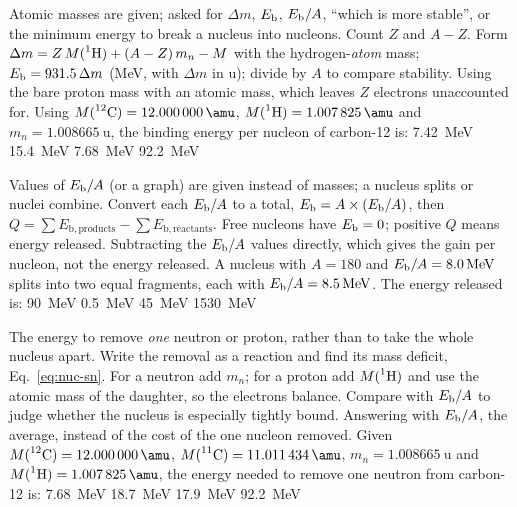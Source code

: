 {Atomic masses are given; asked for $\Delta m$, $E_{\mathrm{b}}$, $E_{\mathrm{b}}/A$, ``which is more stable'', or the
minimum energy to break a nucleus into nucleons.}
{Count $Z$ and $A-Z$. Form $\Delta m=Z\,M(\prescript{1}{}{\mathrm{H}})+(A-Z)\,m_n-M$ with the hydrogen-\emph{atom} mass;
$E_{\mathrm{b}}=931.5\,\Delta m$ (\si{\MeV}, with $\Delta m$ in \si{\amu}); divide by $A$ to compare stability.}
{Using the bare proton mass with an atomic mass, which leaves $Z$ electrons unaccounted for.}
{Using $M(\iso{12}{C})=\SI{12.000000}{\amu}$, $M(\iso{1}{H})=\SI{1.007825}{\amu}$ and
$m_n=\SI{1.008665}{\amu}$, the binding energy per nucleon of carbon-12 is:}
{\SI{7.42}{\MeV}}
{\SI{15.4}{\MeV}}
{\SI{7.68}{\MeV}}
{\SI{92.2}{\MeV}}

{Values of $E_{\mathrm{b}}/A$ (or a graph) are given instead of masses; a nucleus splits or nuclei combine.}
{Convert each $E_{\mathrm{b}}/A$ to a total, $E_{\mathrm{b}}=A\times(E_{\mathrm{b}}/A)$, then $Q=\sum E_{\mathrm b,\text{products}}
-\sum E_{\mathrm b,\text{reactants}}$. Free nucleons have $E_{\mathrm{b}}=0$; positive $Q$ means energy released.}
{Subtracting the $E_{\mathrm{b}}/A$ values directly, which gives the gain per nucleon, not the energy released.}
{A nucleus with $A=180$ and $\Eb/A=\SI{8.0}{\MeV}$ splits into two equal fragments, each with
$\Eb/A=\SI{8.5}{\MeV}$. The energy released is:}
{\SI{90}{\MeV}}
{\SI{0.5}{\MeV}}
{\SI{45}{\MeV}}
{\SI{1530}{\MeV}}

{The energy to remove \emph{one} neutron or proton, rather than to take the whole nucleus apart.}
{Write the removal as a reaction and find its mass deficit, Eq.~\eqref{eq:nuc-sn}. For a neutron add
$m_n$; for a proton add $M(\prescript{1}{}{\mathrm{H}})$ and use the atomic mass of the daughter, so the electrons balance.
Compare with $E_{\mathrm{b}}/A$ to judge whether the nucleus is especially tightly bound.}
{Answering with $E_{\mathrm{b}}/A$, the average, instead of the cost of the one nucleon removed.}
{Given $M(\iso{12}{C})=\SI{12.000000}{\amu}$, $M(\iso{11}{C})=\SI{11.011434}{\amu}$,
$m_n=\SI{1.008665}{\amu}$ and $M(\iso{1}{H})=\SI{1.007825}{\amu}$, the energy needed to remove one neutron
from carbon-12 is:}
{\SI{7.68}{\MeV}}
{\SI{18.7}{\MeV}}
{\SI{17.9}{\MeV}}
{\SI{92.2}{\MeV}}

